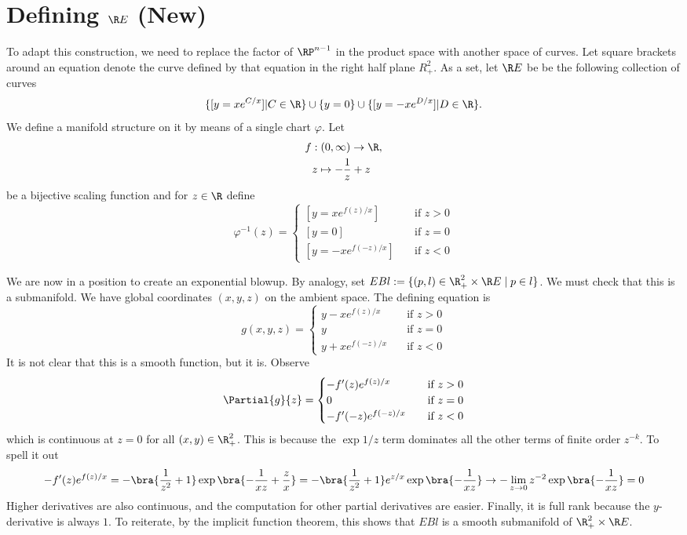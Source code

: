 \section{Defining $\R E$ (New)}

To adapt this construction, we need to replace the factor of $\RP^{n-1}$ in the product space with another space of curves. Let square brackets around an equation denote the curve defined by that equation in the right half plane $R^2_+$. As a set, let $\R E$ be be the following collection of curves
\[
\{ [y = xe^{C/x}] | C \in \R \} \cup \{ y=0 \} \cup \{ [y = -xe^{D/x}] | D \in \R \}.
\]
We define a manifold structure on it by means of a single chart $φ$. Let
\begin{align*}
f :& \;(0,\infty) \to \R, \\
z &\mapsto -\frac{1}{z} + z
\end{align*}
be a bijective scaling function and for $z\in\R$ define
\[
φ^{-1}(z) =
\begin{cases}
[y = xe^{f(z)/x}]    & \quad \text{if } z>0 \\
[y = 0]    & \quad \text{if } z=0 \\
[y = -xe^{f(-z)/x}]    & \quad \text{if } z<0
\end{cases}
\]

We are now in a position to create an exponential blowup. By analogy, set $EBl := \{ (p, l) \in \R^2_+ \times \R E \mid p \in l \}$. We must check that this is a submanifold. We have global coordinates $(x,y,z)$ on the ambient space. The defining equation is
\[
g(x,y,z) =
\begin{cases}
y - xe^{f(z)/x}    & \quad \text{if } z>0 \\
y      & \quad \text{if } z = 0 \\
y + xe^{f(-z)/x}    & \quad \text{if } z<0
\end{cases}
\]
It is not clear that this is a smooth function, but it is. Observe
\[
\Partial{g}{z} =
\begin{cases}
-f'(z)e^{f(z)/x}    & \quad \text{if } z>0 \\
0      & \quad \text{if } z = 0 \\
-f'(-z)e^{f(-z)/x}    & \quad \text{if } z<0
\end{cases}
\]
which is continuous at $z=0$ for all $(x,y) \in \R^2_+$. This is because the $\exp 1/z$ term dominates all the other terms of finite order $z^{-k}$. To spell it out
\[
-f'(z)e^{f(z)/x}
= -\bra{\frac{1}{z^2} + 1} \exp\bra{-\frac{1}{xz} + \frac{z}{x}}
= -\bra{\frac{1}{z^2} + 1} e^{z/x}\exp\bra{-\frac{1}{xz}}
\to - \lim_{z\to 0} z^{-2} \exp\bra{-\frac{1}{xz}} = 0
\]
Higher derivatives are also continuous, and the computation for other partial derivatives are easier. Finally, it is full rank because the $y$-derivative is always $1$. To reiterate, by the implicit function theorem, this shows that $EBl$ is a smooth submanifold of $\R^2_+\times\R E$.

